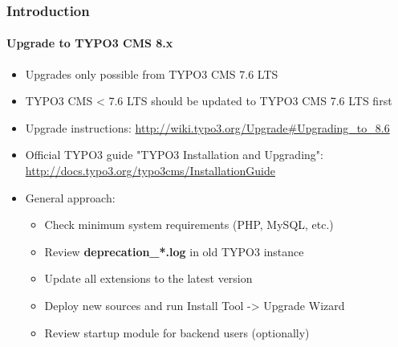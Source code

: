 \begin{frame}[fragile]
	\frametitle{Introduction}
	\framesubtitle{Upgrade to TYPO3 CMS 8.x}

	\begin{itemize}
		\item Upgrades only possible from TYPO3 CMS 7.6 LTS
		\item TYPO3 CMS < 7.6 LTS should be updated to TYPO3 CMS 7.6 LTS first
	\end{itemize}

	\begin{itemize}

		\item Upgrade instructions:\newline
			\smaller\url{http://wiki.typo3.org/Upgrade#Upgrading_to_8.6}\normalsize
		\item Official TYPO3 guide "TYPO3 Installation and Upgrading":
			\smaller\url{http://docs.typo3.org/typo3cms/InstallationGuide}\normalsize
		\item General approach:
			\begin{itemize}
				\item Check minimum system requirements \small(PHP, MySQL, etc.)
				\item Review \textbf{deprecation\_*.log} in old TYPO3 instance
				\item Update all extensions to the latest version
				\item Deploy new sources and run Install Tool -> Upgrade Wizard
				\item Review startup module for backend users (optionally)
			\end{itemize}
	\end{itemize}

\end{frame}


